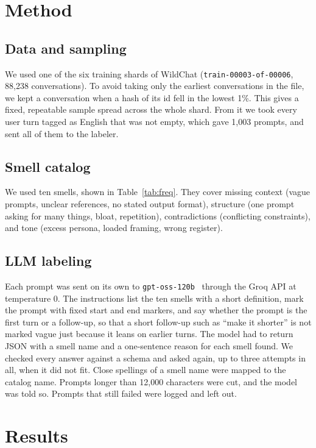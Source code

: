 \documentclass[conference]{IEEEtran}
\begin{document}
\section{Method}
\subsection{Data and sampling}
We used one of the six training shards of WildChat (\texttt{train-00003-of-00006},
88,238 conversations). To avoid taking only the earliest conversations in the
file, we kept a conversation when a hash of its id fell in the lowest 1\%. This
gives a fixed, repeatable sample spread across the whole shard. From it we took
every user turn tagged as English that was not empty, which gave 1,003 prompts,
and sent all of them to the labeler.

\subsection{Smell catalog}
We used ten smells, shown in Table~\ref{tab:freq}. They cover missing context
(vague prompts, unclear references, no stated output format), structure (one
prompt asking for many things, bloat, repetition), contradictions (conflicting
constraints), and tone (excess persona, loaded framing, wrong register).

\subsection{LLM labeling}
Each prompt was sent on its own to \texttt{gpt-oss-120b}~\cite{gptoss} through
the Groq API at temperature 0. The instructions list the ten smells with a short
definition, mark the prompt with fixed start and end markers, and say whether the
prompt is the first turn or a follow-up, so that a short follow-up such as
``make it shorter'' is not marked vague just because it leans on earlier turns.
The model had to return JSON with a smell name and a one-sentence reason for each
smell found. We checked every answer against a schema and asked again, up to three
attempts in all, when it did not fit. Close spellings of a smell name were mapped
to the catalog name. Prompts longer than 12,000 characters were cut, and the model
was told so. Prompts that still failed were logged and left out.

\section{Results}
\end{document}
